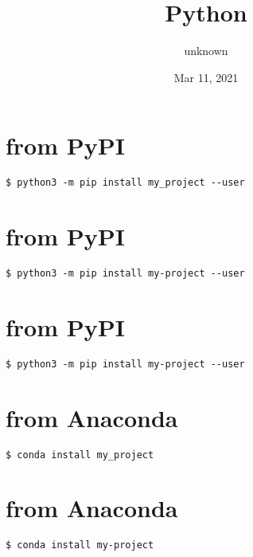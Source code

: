\documentclass[letterpaper,10pt,english]{sphinxmanual}
\title{Python}
\date{Mar 11, 2021}
\author{unknown}
\begin{document}
\pagestyle{empty}
\sphinxmaketitle
\pagestyle{plain}
\sphinxtableofcontents
\pagestyle{normal}
\label{\detokenize{index::doc}}



\chapter{from PyPI}
\label{\detokenize{installation:installation-0-from_PyPI}}\label{\detokenize{installation:installation-0}}
\begin{Verbatim}[commandchars=\\\{\}]
$ python3 -m pip install my_project --user
\end{Verbatim}


\chapter{from PyPI}
\label{\detokenize{installation:installation-1-from_PyPI}}\label{\detokenize{installation:installation-1}}
\begin{Verbatim}[commandchars=\\\{\}]
$ python3 -m pip install my-project --user
\end{Verbatim}


\chapter{from PyPI}
\label{\detokenize{installation:installation-2-from_PyPI}}\label{\detokenize{installation:installation-2}}
\begin{Verbatim}[commandchars=\\\{\}]
$ python3 -m pip install my-project --user
\end{Verbatim}


\chapter{from Anaconda}
\label{\detokenize{installation:installation-3-from_Anaconda}}\label{\detokenize{installation:installation-3}}
\begin{Verbatim}[commandchars=\\\{\}]
$ conda install my_project
\end{Verbatim}


\chapter{from Anaconda}
\label{\detokenize{installation:installation-4-from_Anaconda}}\label{\detokenize{installation:installation-4}}
\begin{Verbatim}[commandchars=\\\{\}]
$ conda install my-project
\end{Verbatim}
\end{document}
